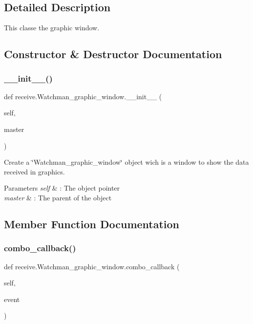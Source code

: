 \subsection{Detailed Description}
This classe the graphic window. 

\subsection{Constructor \& Destructor Documentation}
\mbox{\label{classreceive_1_1_watchman__graphic__window_ab37e9e313e24f7048041e71a7f170137}} 
\subsubsection{\_\_init\_\_()}
{\footnotesize\ttfamily def receive.\+Watchman\+\_\+graphic\+\_\+window.\+\_\+\+\_\+init\+\_\+\+\_\+ (\begin{DoxyParamCaption}\item[{}]{self,  }\item[{}]{master }\end{DoxyParamCaption})}



Create a \char`\"{}\+Watchman\+\_\+graphic\+\_\+window\char`\"{} object wich is a window to show the data received in graphics. 


\begin{DoxyParams}{Parameters}
{\em self} & \+: The object pointer \\
\hline
{\em master} & \+: The parent of the object \\
\hline
\end{DoxyParams}


\subsection{Member Function Documentation}
\mbox{\label{classreceive_1_1_watchman__graphic__window_ad9b67ca0a3b3f09f9e19459e62952eea}} 
\subsubsection{combo\_callback()}
{\footnotesize\ttfamily def receive.\+Watchman\+\_\+graphic\+\_\+window.\+combo\+\_\+callback (\begin{DoxyParamCaption}\item[{}]{self,  }\item[{}]{event }\end{DoxyParamCaption})}



